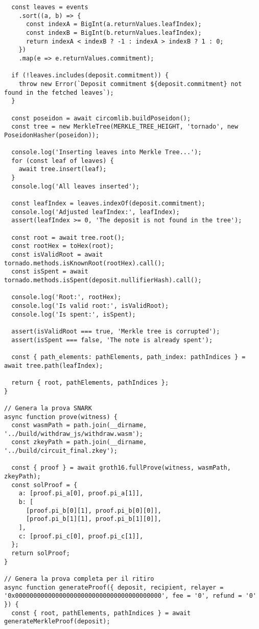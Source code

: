 \begin{lstlisting}
  const leaves = events
    .sort((a, b) => {
      const indexA = BigInt(a.returnValues.leafIndex);
      const indexB = BigInt(b.returnValues.leafIndex);
      return indexA < indexB ? -1 : indexA > indexB ? 1 : 0;
    })
    .map(e => e.returnValues.commitment);

  if (!leaves.includes(deposit.commitment)) {
    throw new Error(`Deposit commitment ${deposit.commitment} not found in the fetched leaves`);
  }

  const poseidon = await circomlib.buildPoseidon();
  const tree = new MerkleTree(MERKLE_TREE_HEIGHT, 'tornado', new PoseidonHasher(poseidon));

  console.log('Inserting leaves into Merkle Tree...');
  for (const leaf of leaves) {
    await tree.insert(leaf);
  }
  console.log('All leaves inserted');

  const leafIndex = leaves.indexOf(deposit.commitment);
  console.log('Adjusted leafIndex:', leafIndex);
  assert(leafIndex >= 0, 'The deposit is not found in the tree');

  const root = await tree.root();
  const rootHex = toHex(root);
  const isValidRoot = await tornado.methods.isKnownRoot(rootHex).call();
  const isSpent = await tornado.methods.isSpent(deposit.nullifierHash).call();

  console.log('Root:', rootHex);
  console.log('Is valid root:', isValidRoot);
  console.log('Is spent:', isSpent);

  assert(isValidRoot === true, 'Merkle tree is corrupted');
  assert(isSpent === false, 'The note is already spent');

  const { path_elements: pathElements, path_index: pathIndices } = await tree.path(leafIndex);

  return { root, pathElements, pathIndices };
}

// Genera la prova SNARK
async function prove(witness) {
  const wasmPath = path.join(__dirname, '../build/withdraw_js/withdraw.wasm');
  const zkeyPath = path.join(__dirname, '../build/circuit_final.zkey');

  const { proof } = await groth16.fullProve(witness, wasmPath, zkeyPath);
  const solProof = {
    a: [proof.pi_a[0], proof.pi_a[1]],
    b: [
      [proof.pi_b[0][1], proof.pi_b[0][0]],
      [proof.pi_b[1][1], proof.pi_b[1][0]],
    ],
    c: [proof.pi_c[0], proof.pi_c[1]],
  };
  return solProof;
}

// Genera la prova completa per il ritiro
async function generateProof({ deposit, recipient, relayer = '0x0000000000000000000000000000000000000000', fee = '0', refund = '0' }) {
  const { root, pathElements, pathIndices } = await generateMerkleProof(deposit);


\end{lstlisting}
